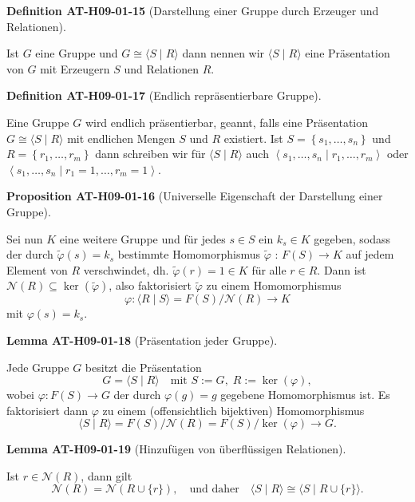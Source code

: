 \documentclass[10pt, letterpaper]{article}
\newcommand{\CustomHeading}[3]{%
  \par\medskip\noindent%
  \textbf{#1 #2} \textnormal{(#3)}.\enskip%
}
\newenvironment{DEF}[2]{\CustomHeading{Definition}{#1}{#2}}{}
\newenvironment{PROP}[2]{\CustomHeading{Proposition}{#1}{#2}}{}
\newenvironment{LEM}[2]{\CustomHeading{Lemma}{#1}{#2}}{}
\begin{document}
\begin{DEF}{AT-H09-01-15}{Darstellung einer Gruppe durch Erzeuger und Relationen}
Ist $G$ eine Gruppe und $G \cong\langle S \mid R\rangle$ dann nennen wir $\langle S \mid R\rangle$ eine Präsentation von $G$ mit Erzeugern $S$ und Relationen $R$.
\end{DEF}

\begin{DEF}{AT-H09-01-17}{Endlich repräsentierbare Gruppe}
Eine Gruppe $G$ wird endlich präsentierbar, geannt, falls eine Präsentation $G \cong\langle S \mid R\rangle$ mit endlichen Mengen $S$ und $R$ existiert. Ist $S=\left\{s_1, \ldots, s_n\right\}$ und $R=\left\{r_1, \ldots, r_m\right\}$ dann schreiben wir für $\langle S \mid R\rangle$ auch $\left\langle s_1, \ldots, s_n \mid r_1, \ldots, r_m\right\rangle$ oder $\left\langle s_1, \ldots, s_n \mid r_1=1, \ldots, r_m=1\right\rangle$.
\end{DEF}

\begin{PROP}{AT-H09-01-16}{Universelle Eigenschaft der Darstellung einer Gruppe}
Sei nun $K$ eine weitere Gruppe und für jedes $s \in S$ ein $k_s \in K$ gegeben, sodass der durch $\tilde{\varphi}(s)=k_s$ bestimmte Homomorphismus $\tilde{\varphi}$ : $F(S) \rightarrow K$ auf jedem Element von $R$ verschwindet, dh. $\tilde{\varphi}(r)=1 \in K$ für alle $r \in R$. Dann ist $\mathcal{N}(R) \subseteq \operatorname{ker}(\tilde{\varphi})$, also faktorisiert $\tilde{\varphi}$ zu einem Homomorphismus 
$$\varphi:\langle R \mid S\rangle=F(S) / \mathcal{N}(R) \rightarrow K$$ 
mit $\varphi(s)=k_s$.
\end{PROP}

\begin{LEM}{AT-H09-01-18}{Präsentation jeder Gruppe}
Jede Gruppe $G$ besitzt die Präsentation
\[
G=\langle S \mid R\rangle \quad\text{mit } S := G,\; R := \ker(\varphi),
\]
wobei $\varphi: F(S) \rightarrow G$ der durch $\varphi(g)=g$ gegebene Homomorphismus ist.
Es faktorisiert dann $\varphi$ zu einem (offensichtlich bijektiven) Homomorphismus
\[
\langle S \mid R\rangle = F(S)/\mathcal{N}(R) = F(S)/\ker(\varphi) \longrightarrow G.
\]
\end{LEM}

\begin{LEM}{AT-H09-01-19}{Hinzufügen von überflüssigen Relationen}
Ist $r \in \mathcal{N}(R)$, dann gilt
\[
\mathcal{N}(R) = \mathcal{N}(R \cup \{r\}),
\quad\text{und daher}\quad
\langle S \mid R \rangle \cong \langle S \mid R \cup \{r\} \rangle.
\]
\end{LEM}
\end{document}
